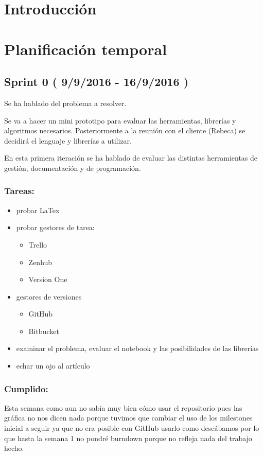 
\section{Introducción}

\section{Planificación temporal}

\subsection{Sprint 0 ( 9/9/2016 - 16/9/2016 )}
Se ha hablado del problema a resolver.

Se va a hacer un mini prototipo para evaluar las herramientas, librerías y algoritmos necesarios. Posteriormente a la reunión con el cliente (Rebeca) se decidirá el lenguaje y librerías a utilizar.

En esta primera iteración se ha hablado de evaluar las distintas herramientas de gestión, documentación y de programación.

\subsubsection{Tareas:}

\begin{itemize}
	\item probar LaTex 
	\item probar gestores de tarea: 
	\begin{itemize}
	\item Trello 
	\item Zenhub 
	\item Version One
	\end{itemize}
	\item gestores de versiones 
	\begin{itemize}
	\item GitHub 
	\item Bitbucket 
	\end{itemize}
	\item examinar el problema, evaluar el notebook y las posibilidades de las librerías \\
	\item echar un ojo al artículo 
\end{itemize}

\subsubsection{Cumplido:}
Esta semana como aun no sabía muy bien cómo usar el repositorio pues las gráfica no nos dicen nada porque tuvimos que cambiar el uso de los milestones inicial a seguir ya que no era posible con GitHub usarlo como deseábamos por lo que hasta la semana 1 no pondré burndown porque no refleja nada del trabajo hecho.

